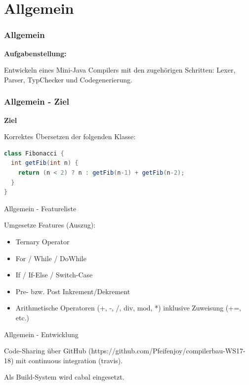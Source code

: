 \section{Allgemein}

\begin{frame}
	\frametitle{Allgemein}
	
\textbf{Aufgabenstellung:}

Entwickeln eines Mini-Java Compilers mit den zugehörigen Schritten: Lexer, Parser, TypChecker und Codegenerierung.
\end{frame}

\begin{frame}[fragile]
\frametitle{Allgemein - Ziel}

\textbf{Ziel} 

Korrektes Übersetzen der folgenden Klasse:

\begin{lstlisting}[language=Java]
class Fibonacci {
  int getFib(int n) {
    return (n < 2) ? n : getFib(n-1) + getFib(n-2);
  }
}
\end{lstlisting}	
\end{frame}



\begin{frame}{Allgemein - Featureliste}

Umgesetze Features (Auszug):

\pause

\begin{itemize}
	\item Ternary Operator \pause
	\item For / While / DoWhile \pause
	\item If / If-Else / Switch-Case \pause 
	\item Pre- bzw. Post Inkrement/Dekrement \pause 
	\item Arithmetische Operatoren (+, -, /, div, mod, *) inklusive Zuweisung (+=, etc.)
\end{itemize}	
\end{frame}

\begin{frame}{Allgemein - Entwicklung}

Code-Sharing über GitHub (https://github.com/Pfeifenjoy/compilerbau-WS17-18) mit continuous integration (travis).

\par \medskip

\pause

Als Build-System wird cabal eingesetzt.	
\end{frame}

